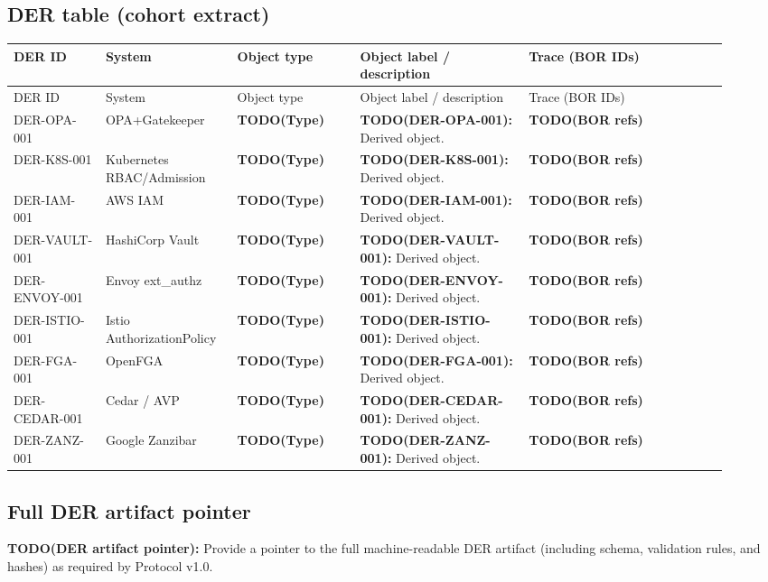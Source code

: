 \subsection{DER table (cohort extract)}
\begin{center}
\begin{longtable}{@{}p{0.12\linewidth}p{0.16\linewidth}p{0.16\linewidth}p{0.22\linewidth}p{0.26\linewidth}@{}}
\toprule
DER ID & System & Object type & Object label / description & Trace (BOR IDs) \\
\midrule
\endfirsthead
\toprule
DER ID & System & Object type & Object label / description & Trace (BOR IDs) \\
\midrule
\endhead
\bottomrule
\endfoot
\bottomrule
\endlastfoot
DER-OPA-001 & OPA+Gatekeeper & \textbf{TODO(Type)} & \textbf{TODO(DER-OPA-001):} Derived object. & \textbf{TODO(BOR refs)} \\
DER-K8S-001 & Kubernetes RBAC/Admission & \textbf{TODO(Type)} & \textbf{TODO(DER-K8S-001):} Derived object. & \textbf{TODO(BOR refs)} \\
DER-IAM-001 & AWS IAM & \textbf{TODO(Type)} & \textbf{TODO(DER-IAM-001):} Derived object. & \textbf{TODO(BOR refs)} \\
DER-VAULT-001 & HashiCorp Vault & \textbf{TODO(Type)} & \textbf{TODO(DER-VAULT-001):} Derived object. & \textbf{TODO(BOR refs)} \\
DER-ENVOY-001 & Envoy ext\_authz & \textbf{TODO(Type)} & \textbf{TODO(DER-ENVOY-001):} Derived object. & \textbf{TODO(BOR refs)} \\
DER-ISTIO-001 & Istio AuthorizationPolicy & \textbf{TODO(Type)} & \textbf{TODO(DER-ISTIO-001):} Derived object. & \textbf{TODO(BOR refs)} \\
DER-FGA-001 & OpenFGA & \textbf{TODO(Type)} & \textbf{TODO(DER-FGA-001):} Derived object. & \textbf{TODO(BOR refs)} \\
DER-CEDAR-001 & Cedar / AVP & \textbf{TODO(Type)} & \textbf{TODO(DER-CEDAR-001):} Derived object. & \textbf{TODO(BOR refs)} \\
DER-ZANZ-001 & Google Zanzibar & \textbf{TODO(Type)} & \textbf{TODO(DER-ZANZ-001):} Derived object. & \textbf{TODO(BOR refs)} \\
\end{longtable}
\end{center}

\subsection{Full DER artifact pointer}
\textbf{TODO(DER artifact pointer):} Provide a pointer to the full machine-readable DER artifact (including schema, validation rules, and hashes) as required by Protocol v1.0.
